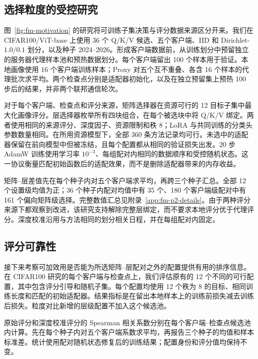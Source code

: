 \subsection{选择粒度的受控研究}
\label{sec:fm-granularity-study}
图~\ref{fig:fm-motivation} 的研究将可训练子集决策与评分数据来源区分开来。我们在 CIFAR100/ViT-base 上使用 36 个 Q/K/V 候选、五个客户端、IID 和 Dirichlet-$1.0/0.1$ 划分，以及种子 2024--2026。形成客户端数据前，从训练划分中预留独立的服务器代理样本池和预热数据划分。每个客户端留出 100 个样本用于验证。本地画像使用 16 个客户端训练样本；Proxy 对五个互不重叠、各含 16 个样本的代理批次求平均。两个检查点分别是适配器初始化，以及在独立预留集上预热 100 步后的结果，并非两个联邦通信轮次。

对于每个客户端、检查点和评分来源，矩阵选择器在资源可行的 12 目标子集中最大化画像评分。层选择器枚举所有四块组合，在每个被选块中将 Q/K/V 绑定。两者使用相同的来源评分、深度因子、资源限制和秩 8；LoRA 与共同训练的分类头参数数量相同。在所用资源模型下，全部 360 条方法记录均可行。未选中的适配器保留在前向模型中但被冻结，且每个配置都从相同的验证损失出发。20 步 AdamW 训练使用学习率 $10^{-3}$、每组配对内相同的数据顺序和受控随机状态。这一协议衡量匹配初始函数后的适配效果，而不是删除适配器带来的内存收益。

矩阵--层差值先在每个种子内对五个客户端求平均，再跨三个种子汇总。全部 12 个设置级均值为正；36 个种子内配对均值中有 35 个、180 个客户端级配对中有 161 个偏向矩阵级选择。完整数值汇总见附录~\ref{app:fm-p2-details}。由于两种评分来源下都观察到改进，该研究支持解除完整层绑定，而不要求本地评分优于代理评分。深度校准沿用与方法相同的划分相关日程，并在每组配对内固定。

\subsection{评分可靠性}\label{sec:fm-score-study}
接下来考察可加效用是否能为所选矩阵--层配对之外的配置提供有用的排序信息。在 CIFAR100 研究的每个客户端与检查点上，我们评估原有的 12 个不同的可行配置，其中包含评分引导和随机子集。每个配置均使用 12 个秩为 8 的目标、相同训练长度和匹配的初始适配器。结果指标是在留出本地样本上的训练前损失减去训练后损失。粒度对比新增的层级配置不加入这个候选池。

原始评分和深度校准评分的 Spearman 相关系数分别在每个客户端--检查点候选池内计算。先在每个种子内对五个客户端系数求平均，再报告三个种子的均值和样本标准差。统计使用配对随机状态修复后的训练结果；配置身份和评分值均保持不变。



